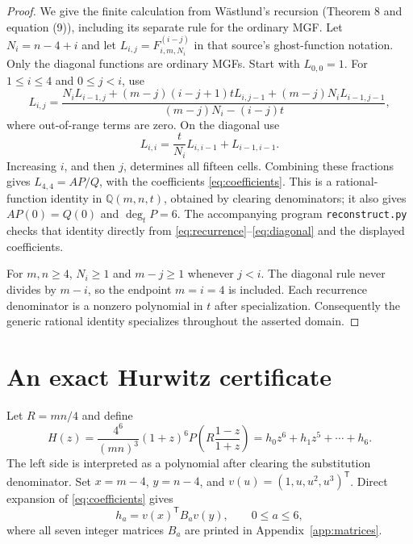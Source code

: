 \documentclass[11pt]{article}
\begin{document}
\begin{proof}
We give the finite calculation from W\"astlund's recursion
\cite{wastlund2026} (Theorem 8 and equation (9)), including its separate
rule for the ordinary MGF. Let $N_i=n-4+i$ and let
$L_{i,j}=F^{(i-j)}_{i,m,N_i}$ in that source's ghost-function notation.
Only the diagonal functions are ordinary MGFs.
Start with $L_{0,0}=1$. For $1\le i\le4$ and $0\le j<i$, use
\begin{equation}\label{eq:recurrence}
 L_{i,j}=\frac{N_iL_{i-1,j}+(m-j)(i-j+1)tL_{i,j-1}
                         +(m-j)N_iL_{i-1,j-1}}
                   {(m-j)N_i-(i-j)t},
\end{equation}
where out-of-range terms are zero. On the diagonal use
\begin{equation}\label{eq:diagonal}
 L_{i,i}=\frac{t}{N_i}L_{i,i-1}+L_{i-1,i-1}.
\end{equation}
Increasing $i$, and then $j$, determines all fifteen cells. Combining
these fractions gives $L_{4,4}=AP/Q$, with the coefficients
\eqref{eq:coefficients}. This is a rational-function identity in
$\mathbb Q(m,n,t)$, obtained by clearing denominators; it also gives
$AP(0)=Q(0)$ and $\deg_tP=6$.
The accompanying program \texttt{reconstruct.py} checks that identity
directly from \eqref{eq:recurrence}--\eqref{eq:diagonal} and the displayed
coefficients.

For $m,n\ge4$, $N_i\ge1$ and $m-j\ge1$ whenever $j<i$.
The diagonal rule never divides by $m-i$, so the endpoint $m=i=4$
is included. Each recurrence denominator is a nonzero polynomial in
$t$ after specialization. Consequently the generic rational identity
specializes throughout the asserted domain.
\end{proof}

\section{An exact Hurwitz certificate}

Let $R=mn/4$ and define
\begin{equation}\label{eq:H}
 H(z)=\frac{4^6}{(mn)^3}(1+z)^6
       P\!\left(R\frac{1-z}{1+z}\right)
      =h_0z^6+h_1z^5+\cdots+h_6.
\end{equation}
The left side is interpreted as a polynomial after clearing the
substitution denominator. Set $x=m-4$, $y=n-4$, and
$v(u)=(1,u,u^2,u^3)^{\mathsf T}$. Direct expansion of
\eqref{eq:coefficients} gives
\begin{equation}\label{eq:matrices}
 h_a=v(x)^{\mathsf T}B_a v(y),\qquad 0\le a\le6,
\end{equation}
where all seven integer matrices $B_a$ are printed in
Appendix~\ref{app:matrices}.
\end{document}
